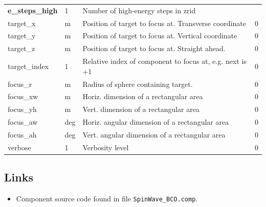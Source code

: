 \begin{longtable}{p{}p{}p{}p{}}
\textbf{e\_steps\_high} & 1 & Number of high-energy steps in zrid &  \\
target\_x & m & Position of target to focus at. Transverse coordinate & 0 \\
target\_y & m & Position of target to focus at. Vertical coordinate & 0 \\
target\_z & m & Position of target to focus at. Straight ahead. & 0 \\
target\_index & 1 & Relative index of component to focus at, e.g. next is +1 & 0 \\
focus\_r & m & Radius of sphere containing target. & 0 \\
focus\_xw & m & Horiz. dimension of a rectangular area & 0 \\
focus\_yh & m & Vert. dimension of a rectangular area & 0 \\
focus\_aw & deg & Horiz. angular dimension of a rectangular area & 0 \\
focus\_ah & deg & Vert. angular dimension of a rectangular area & 0 \\
verbose & 1 & Verbosity level & 0 \\
\bottomrule
\end{longtable}

\subsection*{Links}
\begin{itemize}
  \item Component source code found in file \texttt{SpinWave\_BCO.comp}.
\end{itemize}
